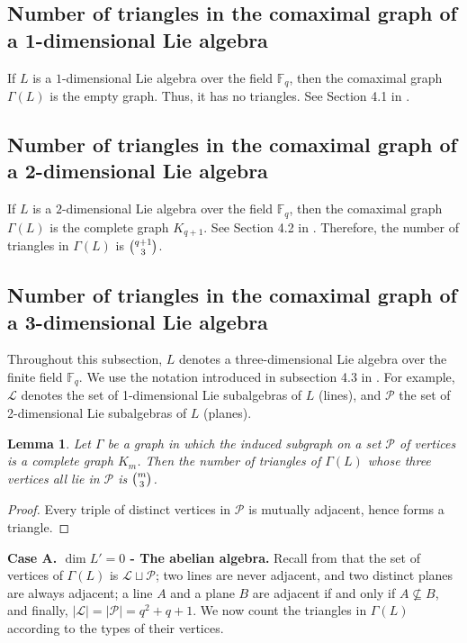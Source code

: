 \documentclass[11pt]{amsart}
\theoremstyle{plain}
\newtheorem{lemma}[theorem]{Lemma}
\def\F{\mathbb{F}}
\begin{document}
\subsection{Number of triangles in the comaximal graph of a 1-dimensional Lie algebra}
If $L$ is a $1$-dimensional Lie algebra over the field $\F_q$, then the comaximal graph $\Gamma(L)$ is the empty graph. Thus, it has no triangles. See Section 4.1 in \cite{TZG}.


\subsection{Number of triangles in the comaximal graph of a 2-dimensional Lie algebra}
If $L$ is a $2$-dimensional Lie algebra over the field $\F_q$, then the comaximal graph $\Gamma(L)$ is the complete graph $K_{q+1}$. See Section 4.2 in \cite{TZG}. Therefore, the number of triangles in $\Gamma(L)$ is $\tbinom{q+1}{3}$.

 
\subsection{Number of triangles in the comaximal graph of a 3-dimensional Lie algebra}
Throughout this subsection, $L$ denotes a three-dimensional Lie algebra over the finite field $\F_q$. We use the notation introduced in subsection 4.3 in \cite{TZG}. For example, $\mathcal L$ denotes the set of 1-dimensional Lie subalgebras of $L$ (lines), and $\mathcal P$ the set of 2-dimensional Lie subalgebras of $L$ (planes).

\smallskip

\begin{lemma}\label{T3P}
Let $\Gamma$ be a graph in which the induced subgraph on a set $\mathcal{P}$ of vertices is a complete graph $K_{m}$.  Then the number of triangles of $\Gamma(L)$ whose three vertices all lie in $\mathcal{P}$ is $\tbinom{m}{3}$.
\end{lemma}

\begin{proof}
Every triple of distinct vertices in $\mathcal{P}$ is mutually adjacent, hence forms a triangle.
\end{proof}

\smallskip


\textbf{Case A. $\dim L'=0$ - The abelian algebra.} Recall from \cite[Proposition 4.2]{TZG} that the set of vertices of $\Gamma(L)$ is $\mathcal{L} \sqcup \mathcal{P}$; two lines are never adjacent, and two distinct planes are always adjacent; a line $A$ and a plane $B$ are adjacent if and only if $A \nsubseteq B$, and finally, $|\mathcal L| = |\mathcal P| = q^2+q+1$. We now count the triangles in $\Gamma(L)$ according to the types of their
vertices.
\end{document}
